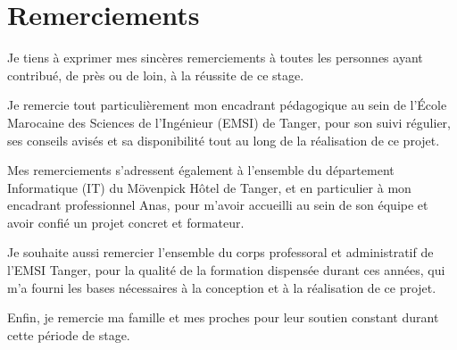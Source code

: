 \chapter*{Remerciements}

Je tiens à exprimer mes sincères remerciements à toutes les personnes ayant contribué,
de près ou de loin, à la réussite de ce stage.

Je remercie tout particulièrement mon encadrant pédagogique au sein de l'École Marocaine
des Sciences de l'Ingénieur (EMSI) de Tanger, pour son suivi régulier, ses conseils
avisés et sa disponibilité tout au long de la réalisation de ce projet.

Mes remerciements s'adressent également à l'ensemble du département Informatique (IT)
du Mövenpick Hôtel de Tanger, et en particulier à mon encadrant professionnel Anas, pour
m'avoir accueilli au sein de son équipe et avoir confié un projet concret et formateur.

Je souhaite aussi remercier l'ensemble du corps professoral et administratif de l'EMSI
Tanger, pour la qualité de la formation dispensée durant ces années, qui m'a fourni les
bases nécessaires à la conception et à la réalisation de ce projet.

Enfin, je remercie ma famille et mes proches pour leur soutien constant durant cette
période de stage.
